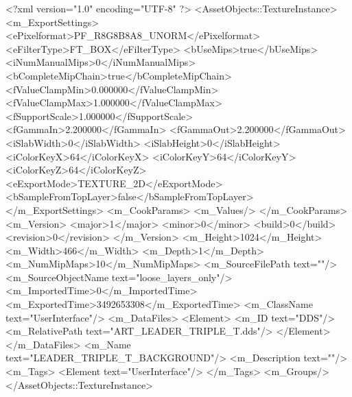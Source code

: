 <?xml version="1.0" encoding="UTF-8" ?>
<AssetObjects::TextureInstance>
	<m_ExportSettings>
		<ePixelformat>PF_R8G8B8A8_UNORM</ePixelformat>
		<eFilterType>FT_BOX</eFilterType>
		<bUseMips>true</bUseMips>
		<iNumManualMips>0</iNumManualMips>
		<bCompleteMipChain>true</bCompleteMipChain>
		<fValueClampMin>0.000000</fValueClampMin>
		<fValueClampMax>1.000000</fValueClampMax>
		<fSupportScale>1.000000</fSupportScale>
		<fGammaIn>2.200000</fGammaIn>
		<fGammaOut>2.200000</fGammaOut>
		<iSlabWidth>0</iSlabWidth>
		<iSlabHeight>0</iSlabHeight>
		<iColorKeyX>64</iColorKeyX>
		<iColorKeyY>64</iColorKeyY>
		<iColorKeyZ>64</iColorKeyZ>
		<eExportMode>TEXTURE_2D</eExportMode>
		<bSampleFromTopLayer>false</bSampleFromTopLayer>
	</m_ExportSettings>
	<m_CookParams>
		<m_Values/>
	</m_CookParams>
	<m_Version>
		<major>1</major>
		<minor>0</minor>
		<build>0</build>
		<revision>0</revision>
	</m_Version>
	<m_Height>1024</m_Height>
	<m_Width>466</m_Width>
	<m_Depth>1</m_Depth>
	<m_NumMipMaps>10</m_NumMipMaps>
	<m_SourceFilePath text=""/>
	<m_SourceObjectName text="loose_layers_only"/>
	<m_ImportedTime>0</m_ImportedTime>
	<m_ExportedTime>3492653308</m_ExportedTime>
	<m_ClassName text="UserInterface"/>
	<m_DataFiles>
		<Element>
			<m_ID text="DDS"/>
			<m_RelativePath text="ART_LEADER_TRIPLE_T.dds"/>
		</Element>
	</m_DataFiles>
	<m_Name text="LEADER_TRIPLE_T_BACKGROUND"/>
	<m_Description text=""/>
	<m_Tags>
		<Element text="UserInterface"/>
	</m_Tags>
	<m_Groups/>
</AssetObjects::TextureInstance>

